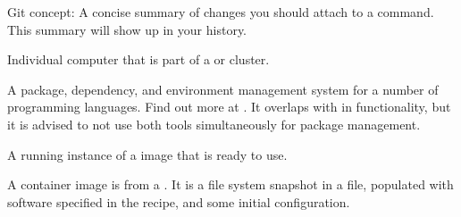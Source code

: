 \begin{description}
\ignorespaces 
\sphinxAtStartPar
Git concept: A concise summary of changes you should attach to a  command. This summary will
show up in your {\hyperref[\detokenize{glossary:term-DataLad-dataset}]{}} history.

\newpage

\sphinxAtStartPar
Individual computer that is part of a {\hyperref[\detokenize{glossary:term-high-performance-computing}]{}} or {\hyperref[\detokenize{glossary:term-high-throughput-computing}]{}} cluster.

\sphinxAtStartPar
A package, dependency, and environment management system for a number of programming languages.
Find out more at .
It overlaps with {\hyperref[\detokenize{glossary:term-pip}]{}} in functionality, but it is advised to not use both tools simultaneously for package management.

\ignorespaces 
\sphinxAtStartPar
A running instance of a {\hyperref[\detokenize{glossary:term-container-image}]{}} image that is ready to use.

\ignorespaces 
\sphinxAtStartPar
A container image is  from a {\hyperref[\detokenize{glossary:term-container-recipe}]{}}.
It is a file system snapshot in a file, populated with software specified in the recipe, and some initial configuration.


\end{description}
